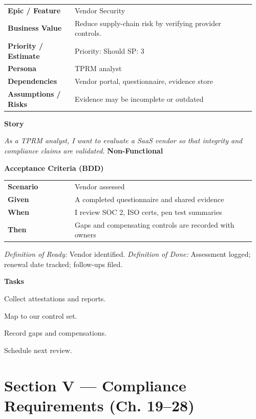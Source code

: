 \documentclass[11pt,letterpaper]{article}
\makeatletter
\newenvironment{kvtable}{%
  \begin{tabular}{@{}>{\bfseries\arraybackslash}p{0.26\linewidth} p{0.70\linewidth}@{}}
}{\end{tabular}}
\newenvironment{bdd}{%
  \begin{tabular}{@{}>{\bfseries\arraybackslash}p{0.26\linewidth} p{0.70\linewidth}@{}}
}{\end{tabular}}
\newcommand{\DoRDoD}[2]{%
  \vspace{0.35em}
  {\footnotesize\color{Muted}%
    \textit{Definition of Ready:} #1 \; \textbullet\;
    \textit{Definition of Done:} #2%
  }%
}
\newenvironment{storycard}[2]{%
  \begin{tcolorbox}[cloudcard, title={#1 --- #2}]%
}{\end{tcolorbox}}
\newcommand{\sectionlabel}[1]{\vspace{0.35em}\textbf{#1}\par}
\makeatother
\begin{document}
\begin{storycard}{CCS-18}{Ch. 18 — Third-Party Provider Integrity}
\begin{kvtable}
Epic / Feature & Vendor Security\\
Business Value & Reduce supply-chain risk by verifying provider controls.\\
Priority / Estimate & Priority: Should \quad SP: 3\\
Persona & TPRM analyst\\
Dependencies & Vendor portal, questionnaire, evidence store\\
Assumptions / Risks & Evidence may be incomplete or outdated\\
\end{kvtable}
\sectionlabel{Story}
\textit{As a TPRM analyst, I want to evaluate a SaaS vendor so that integrity and compliance claims are validated.}
\sectionlabel{Non-Functional}\;
\sectionlabel{Acceptance Criteria (BDD)}
\begin{bdd}
Scenario & Vendor assessed\\
Given & A completed questionnaire and shared evidence\\
When & I review SOC 2, ISO certs, pen test summaries\\
Then & Gaps and compensating controls are recorded with owners\\
\end{bdd}
\DoRDoD{Vendor identified.}{Assessment logged; renewal date tracked; follow-ups filed.}
\sectionlabel{Tasks}
\begin{checklist}
\item Collect attestations and reports.
\item Map to our control set.
\item Record gaps and compensations.
\item Schedule next review.
\end{checklist}
\end{storycard}

\section{Section V — Compliance Requirements (Ch. 19--28)}
\end{document}
